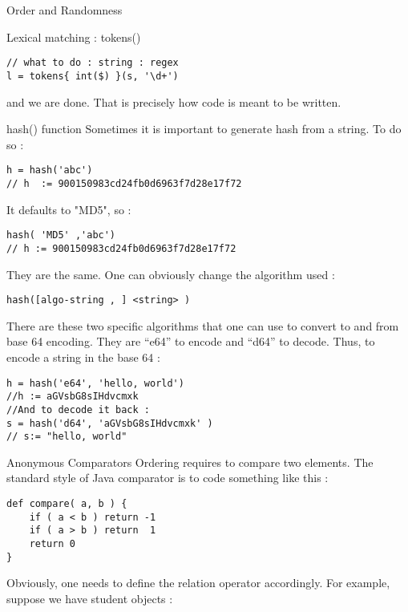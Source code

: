 \begin{section}{Order and Randomness}
\begin{subsection}{Lexical matching : tokens()}
\begin{lstlisting}[style=JexlStyle]
// what to do : string : regex 
l = tokens{ int($) }(s, '\d+')
\end{lstlisting}  

and we are done. That is precisely how code is meant to be written.  
  
\end{subsection}

\begin{subsection}{hash() function}
Sometimes it is important to generate hash from a string. To do so :

\begin{lstlisting}[style=JexlStyle]
h = hash('abc')
// h  := 900150983cd24fb0d6963f7d28e17f72
\end{lstlisting}  

It defaults to "MD5", so :

\begin{lstlisting}[style=JexlStyle]
hash( 'MD5' ,'abc')
// h := 900150983cd24fb0d6963f7d28e17f72
\end{lstlisting}  

They are the same. One can obviously change the algorithm used :

\begin{lstlisting}[style=JexlStyle]
hash([algo-string , ] <string> )
\end{lstlisting}  

There are these two specific algorithms that one can use to convert to and from base 64 encoding. 
They are ``e64'' to encode and ``d64'' to decode. Thus, to encode a string in the base 64 :

\begin{lstlisting}[style=JexlStyle]
h = hash('e64', 'hello, world')
//h := aGVsbG8sIHdvcmxk
//And to decode it back :
s = hash('d64', 'aGVsbG8sIHdvcmxk' )
// s:= "hello, world"
\end{lstlisting}  

\end{subsection}

\begin{subsection}{Anonymous Comparators}
Ordering requires to compare two elements. 
The standard style of Java comparator is to code something like this :

\begin{lstlisting}[style=JexlStyle]
def compare( a, b ) {
    if ( a < b ) return -1 
    if ( a > b ) return  1
    return 0 
}
\end{lstlisting}  
Obviously, one needs to define the relation operator accordingly.
For example, suppose we have  student objects :


\end{subsection}
\end{section}
